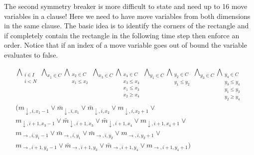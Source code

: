 \documentclass[]{llncs}
\newcommand{\TODO}[1]{ {\color{red}{TODO: #1} }}
\begin{document}
The second symmetry breaker is more difficult to state and need up to 16 move variables in a clause! Here we need to
have move variables from both dimensions in the same clause. The basic idea is to identify the corners of the rectangle
and if completely contain the rectangle in the following time step then enforce an order. Notice that if an index of a
move variable goes out of bound the variable evaluates to false. \TODO{There must be an easier way to describe this...,
nobody can understand that.}

\begin{equation}
\begin{array}{l}
\bigwedge_{\substack{i\in I \\ i < N }}
\bigwedge_{x_1 \in C} \bigwedge_{\substack{x_2\in C \\ x_1 \leq x_2 }} 
\bigwedge_{x_3 \in C} \bigwedge_{\substack{x_4\in C \\ x_3 \leq x_4 \\ x_1 \leq x_3 \\ x_2 \geq x_4}} 
\bigwedge_{y_1 \in C} \bigwedge_{\substack{y_2\in C \\ y_1 \leq y_2 }} 
\bigwedge_{y_3 \in C} \bigwedge_{\substack{y_4\in C \\ y_3 \leq y_4 \\ y_1 \leq y_3 \\ y_2 \geq y_4}} \\
(m_{\downarrow,i,x_1 -1} \vee \bar m_{\downarrow,i,x_1} \vee \bar m_{\downarrow,i,x_2} \vee m_{\downarrow,i,x_2+1} \vee \\
 m_{\downarrow,i+1,x_3 -1} \vee \bar m_{\downarrow,i+1,x_3} \vee \bar m_{\downarrow,i+1,x_4} \vee m_{\downarrow,i+1,x_4+1} \vee \\
 m_{\rightarrow,i,y_1 -1} \vee \bar m_{\rightarrow,i,y_1} \vee \bar m_{\rightarrow,i,y_2} \vee m_{\rightarrow,i,y_2+1} \vee \\
 m_{\rightarrow,i+1,y_3 -1} \vee \bar m_{\rightarrow,i+1,y_3} \vee \bar m_{\rightarrow,i+1,y_4} \vee m_{\rightarrow,i+1,y_4+1})
\end{array}
\end{equation}
\end{document}
